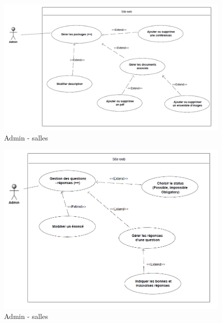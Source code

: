     \begin{figure}[h]
        \begin{center}
            \includegraphics[scale=0.50]{images/uml/adminPackages.png} 
        \end{center}

        \caption{Admin - salles}
        \label{Admin - salles}
    \end{figure}

    \begin{figure}[h]
        \begin{center}
            \includegraphics[scale=0.50]{images/uml/adminQuestionsReponses.png} 
        \end{center}

        \caption{Admin - salles}
        \label{Admin - salles}
    \end{figure}

